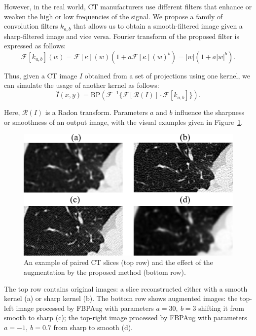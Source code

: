 However, in the real world, CT manufacturers use different filters that enhance or weaken the high or low frequencies of the signal. We propose a family of convolution filters $k_{a,b}$ that allows us to obtain a smooth-filtered image given a sharp-filtered image and vice versa. Fourier transform of the proposed filter is expressed as follows:
\[\mathcal{F}[k_{a,b}](w) = \mathcal{F}[\kappa](w)(1 + a \mathcal{F}[\kappa](w)^b) = |w|(1 + a|w|^b).\]

Thus, given a CT image $I$ obtained from a set of projections using one kernel, we can simulate the usage of another kernel as follows:
\[\hat{I}(x, y) = \text{BP}\left(\mathcal{F}^{-1}\{\mathcal{F}[\mathcal{R}(I)]\cdot\mathcal{F}[k_{a,b}]\}\right).\]

Here, $\mathcal{R}(I)$ is a Radon transform. Parameters $a$ and $b$ influence the sharpness or smoothness of an output image, with the visual examples given in Figure~\ref{fig:crops}.

\begin{figure}[h]
	\centering
	\includegraphics[width=0.95\linewidth]{Dissertation/Figures/3_ct/4crops.png}%
	\caption{An example of paired CT slices (top row) and the effect of the augmentation by the proposed method (bottom row).} %
	\label{fig:crops}
\end{figure}

The top row contains original images: a slice reconstructed either with a smooth kernel (a) or sharp kernel (b). The bottom row shows augmented images: the top-left image processed by FBPAug with parameters $a=30,~b=3$ shifting it from smooth to sharp (c); the top-right image processed by FBPAug with parameters $a=-1,~b=0.7$ from sharp to smooth (d).

